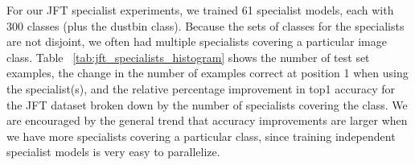 For our JFT specialist experiments, we trained 61 specialist models, each with 300 classes (plus the dustbin class).
Because the sets of classes for the specialists are not disjoint, we often had multiple specialists covering a
particular image class.  Table ~\ref{tab:jft_specialists_histogram} shows the number of test set examples, the change in
the number of examples correct at position 1 when using the specialist(s), and the relative percentage improvement in
top1 accuracy for the JFT dataset broken down by the number of specialists covering the class.  We are encouraged by the
general trend that accuracy improvements are larger when we have more specialists covering a particular class, since
training independent specialist models is very easy to parallelize.

